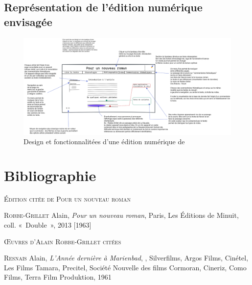 \documentclass[12pt, a4paper]{article}
\begin{document}
   


\subsection{Représentation de l'édition numérique envisagée}



\begin{figure}[H]
    \centering
    \includegraphics[scale=0.38]{img/202211_mevel_punr_edition_numerique.png}
    \caption{Design et fonctionnalitées d'une édition numérique de \punr{}}
    \label{schema}
\end{figure}

\section{Bibliographie}

\vspace*{2cm}
		\setlength{\parindent}{0cm}
{\large\textsc{Édition citée de Pour un nouveau roman}}
		\vspace*{1cm}
		\setlength{\parindent}{25pt}
		
		
		
		
		\textsc{Robbe-Grillet} Alain, \textit{Pour un nouveau roman}, Paris, Les Éditions de Minuit, coll. «~Double~», 2013 [1963]\par 
		 
		
	
		\vspace*{2cm}
		\setlength{\parindent}{0cm}
{\large\textsc{Œuvres d'Alain Robbe-Grillet citées}}
		\vspace*{1cm}
		\setlength{\parindent}{25pt}
		
		
		
		
		\textsc{Resnais} Alain, \textit{L'Année dernière à Marienbad}, , Silverfilms, Argos Films, Cinétel, Les Films Tamara, Precitel, Société Nouvelle des films Cormoran, Cineriz, Como Films, Terra Film Produktion, 1961\par 
		 
\end{document}
